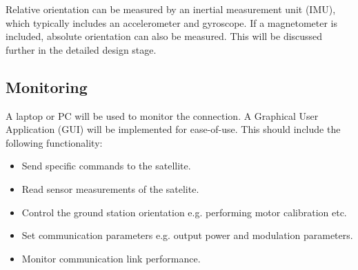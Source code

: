 Relative orientation can be measured by an inertial measurement unit (IMU), which typically includes an accelerometer and gyroscope. If a magnetometer is included, absolute orientation can also be measured. This will be discussed further in the detailed design stage.

\subsection{Monitoring}
A laptop or PC will be used to monitor the connection. A Graphical User Application (GUI) will be implemented for ease-of-use. This should include the following functionality:
\begin{itemize}
    \item Send specific commands to the satellite.
    \item Read sensor measurements of the satelite.
    \item Control the ground station orientation e.g. performing motor calibration etc.
    \item Set communication parameters e.g. output power and modulation parameters.
    \item Monitor communication link performance.
\end{itemize}